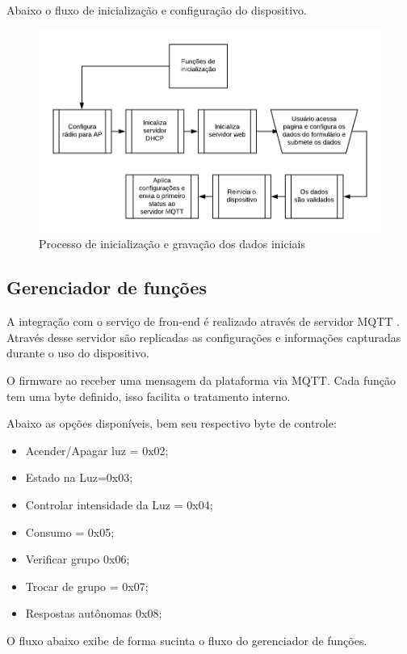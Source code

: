 \documentclass[openright]{normas-utf-tex} %
\begin{document}
Abaixo o fluxo de inicialização e configuração do dispositivo.
\begin{figure}[!htb]
     \centering
     \includegraphics[scale=1]{Ini_flux.png}
     \caption{Processo de inicialização e gravação dos dados iniciais}
     \label{}
\end{figure}

\subsection{Gerenciador de funções}

A integração com o serviço de fron-end é realizado através de servidor MQTT \cite{Novatec}. Através desse servidor são replicadas as configurações e informações capturadas durante o uso do dispositivo. 

O firmware ao receber uma mensagem da plataforma via MQTT. Cada função tem uma byte definido, isso facilita o tratamento interno.

Abaixo as opções disponíveis, bem seu respectivo byte de controle:

\begin{itemize}
    \item Acender/Apagar luz = 0x02;
    \item Estado na Luz=0x03;
    \item Controlar intensidade da Luz = 0x04;
    \item Consumo = 0x05;
    \item Verificar grupo 0x06;
    \item Trocar de grupo = 0x07;
    \item Respostas autônomas 0x08;
\end{itemize}

O fluxo abaixo exibe de forma sucinta o fluxo do gerenciador de funções.
\end{document}
